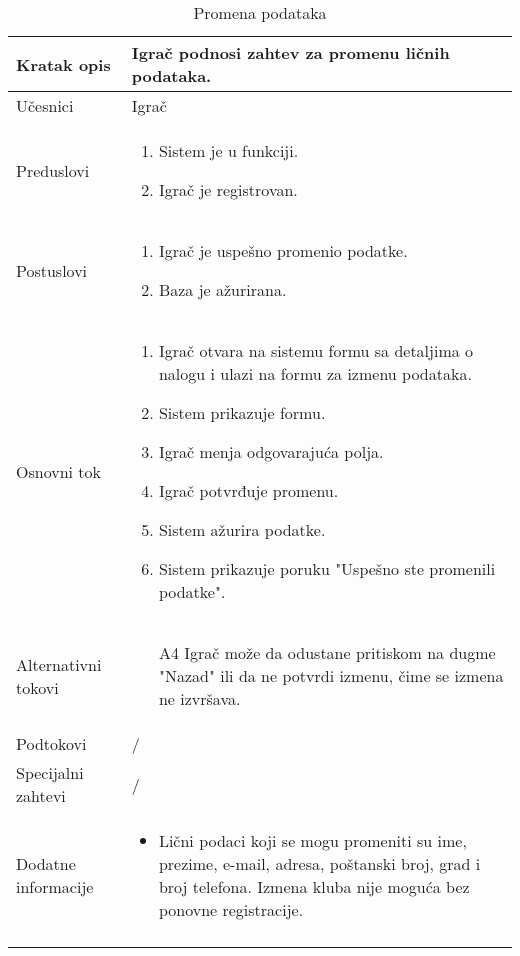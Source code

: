 \documentclass{article}
\begin{document}
    \begin{longtable}{| p{} | p{} |} 
        \hline
            Kratak opis & Igrač podnosi zahtev za promenu ličnih podataka.\\ 
        \hline    
            Učesnici & Igrač  \\
        \hline
            Preduslovi & 
                \begin{enumerate}
                   \item Sistem je u funkciji.
                   \item Igrač je registrovan.
               \end{enumerate}\\
        \hline  
            Postuslovi & 
                \begin{enumerate}
                    \item Igrač je uspešno promenio podatke.
                    \item Baza je ažurirana.
                \end{enumerate}\\
        \hline
            Osnovni tok & 
                \begin{enumerate}
                    \item Igrač otvara na sistemu formu sa detaljima o nalogu i ulazi na formu za izmenu podataka.
                    \item Sistem prikazuje formu.
                    \item Igrač menja odgovarajuća polja.
                    \item Igrač potvrđuje promenu.
                    \item Sistem ažurira podatke.
                    \item Sistem prikazuje poruku "Uspešno ste promenili podatke".
                \end{enumerate}\\
        \hline
            Alternativni tokovi & 
                \begin{itemize}
                    \item[A4] Igrač može da odustane pritiskom na dugme "Nazad" ili da ne potvrdi izmenu, čime se izmena ne izvršava.
                \end{itemize}\\
        \hline
            Podtokovi & /\\
        \hline
            Specijalni zahtevi &/\\
        \hline
            Dodatne informacije & 
                \begin{itemize}
                    \item Lični podaci koji se mogu promeniti su ime, prezime, e-mail, adresa, poštanski broj, grad i broj telefona. Izmena kluba nije moguća bez ponovne registracije.
                \end{itemize} \\
        \hline
        \caption{Promena podataka} 
    \end{longtable}
\end{document}
